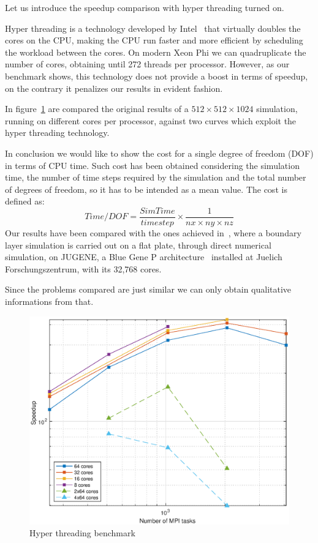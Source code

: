 Let us introduce the speedup comparison with hyper threading turned on. \par
Hyper threading is a technology developed by Intel~\cite{hyper:paper}  that virtually doubles the cores on the CPU, making the CPU run faster and more efficient by scheduling the workload between the cores. On modern Xeon Phi we can quadruplicate the number of cores, obtaining until 272 threads per processor. However, as our benchmark shows, this technology does not provide a boost in terms of speedup, on the contrary it penalizes our results in evident fashion.\par
In figure~\ref{hyper} are compared the original results of a $512\times 512\times 1024$ simulation, running on different cores per processor, against two curves which exploit the hyper threading technology.\\
\par
In conclusion we would like to show the cost for a single degree of freedom (DOF) in terms of CPU time.
Such cost has been obtained considering the simulation time, the number of time steps required by the simulation and the total number of degrees of freedom, so it has to be intended as a mean value.
The cost is defined as:
\begin{equation}
Time/DOF = \frac{Sim Time}{timestep}\times \frac{1}{nx\times ny\times nz}
\end{equation}
Our results have been compared with the ones achieved in~\cite{Borrel}, where a boundary layer simulation is carried out on a flat plate, through direct numerical simulation, on JUGENE, a Blue Gene P architecture~\cite{blue:gene:chip}\cite{blue:gene:network} installed at Juelich Forschungszentrum, with its 32,768 cores.\par
Since the problems compared are just similar we can only obtain qualitative informations from that.

\begin{figure}
\begin{center}
\includegraphics[scale=0.55]{grafici/hyperthreading}
\caption{Hyper threading benchmark}
\label{hyper}
\end{center}
\end{figure}

